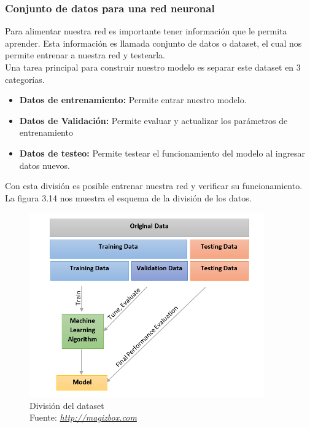 \subsubsection{Conjunto de datos para una red neuronal}
Para alimentar nuestra red es importante tener información que le permita aprender. Esta información es llamada conjunto de datos o dataset, el cual nos permite entrenar a nuestra red y testearla.\\ Una tarea principal para construir nuestro modelo es separar este dataset en 3 categorías.
\begin{itemize}
	\item \textbf{Datos de entrenamiento:} Permite entrar nuestro modelo.
	\item \textbf{Datos de Validación:} Permite evaluar y actualizar los parámetros de entrenamiento
	\item \textbf{Datos de testeo:} Permite testear el funcionamiento del modelo al ingresar datos nuevos.
\end{itemize}
Con esta división es posible entrenar nuestra red y verificar su funcionamiento. La figura 3.14 nos muestra el esquema de la división de los datos.
\begin{figure}[H]
	\centering
	\includegraphics[width=0.9\textwidth]{Figures/validation.PNG}
	\caption{División del dataset \\ Fuente:  \href{http://magizbox.com/training/machinelearning/site/evaluation/}{\textit{http://magizbox.com}}}
	\label{validacion}
\end{figure} 







\afterpage{\blankpage}